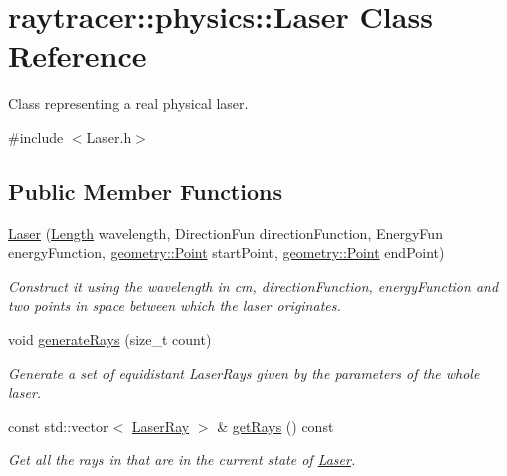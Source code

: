 \hypertarget{classraytracer_1_1physics_1_1Laser}{}\section{raytracer\+:\+:physics\+:\+:Laser Class Reference}
\label{classraytracer_1_1physics_1_1Laser}


Class representing a real physical laser.  




{\ttfamily \#include $<$Laser.\+h$>$}

\subsection*{Public Member Functions}
\begin{DoxyCompactItemize}
\item 
\hyperlink{classraytracer_1_1physics_1_1Laser_aaac32df0c929962080aa6c6e0acdff17}{Laser} (\hyperlink{structraytracer_1_1physics_1_1Length}{Length} wavelength, Direction\+Fun direction\+Function, Energy\+Fun energy\+Function, \hyperlink{classraytracer_1_1geometry_1_1Point}{geometry\+::\+Point} start\+Point, \hyperlink{classraytracer_1_1geometry_1_1Point}{geometry\+::\+Point} end\+Point)
\begin{DoxyCompactList}\small\item\em Construct it using the wavelength in cm, direction\+Function, energy\+Function and two points in space between which the laser originates. \end{DoxyCompactList}\item 
void \hyperlink{classraytracer_1_1physics_1_1Laser_a5f2620bcf974198ccc541ea60a7ed6a9}{generate\+Rays} (size\+\_\+t count)
\begin{DoxyCompactList}\small\item\em Generate a set of equidistant Laser\+Rays given by the parameters of the whole laser. \end{DoxyCompactList}\item 
const std\+::vector$<$ \hyperlink{structraytracer_1_1physics_1_1LaserRay}{Laser\+Ray} $>$ \& \hyperlink{classraytracer_1_1physics_1_1Laser_af35cc781f5f6b39bfa9e25369a63a856}{get\+Rays} () const
\begin{DoxyCompactList}\small\item\em Get all the rays in that are in the current state of \hyperlink{classraytracer_1_1physics_1_1Laser}{Laser}. \end{DoxyCompactList}\item 

\end{DoxyCompactItemize}
